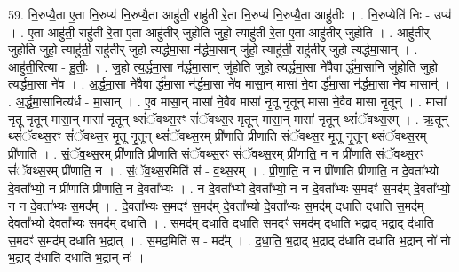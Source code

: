 \documentclass[17pt]{extarticle}
\begin{document}
59. नि॒रुप्यै॒ता ए॒ता नि॒रुप्य॑ नि॒रुप्यै॒ता आहु॑ती॒ राहु॑ती रे॒ता नि॒रुप्य॑ नि॒रुप्यै॒ता आहु॑तीः । . नि॒रुप्येति॑ निः - उप्य॑ । . ए॒ता आहु॑ती॒ राहु॑ती रे॒ता ए॒ता आहु॑तीर् जुहोति जुहो॒ त्याहु॑ती रे॒ता ए॒ता आहु॑तीर् जुहोति । . आहु॑तीर् जुहोति जुहो॒ त्याहु॑ती॒ राहु॑तीर् जुहो त्यर्द्धमा॒सा न॑र्द्धमा॒सान् जु॑हो॒ त्याहु॑ती॒ राहु॑तीर् जुहो त्यर्द्धमा॒सान् । . आहु॑ती॒रित्या - हु॒तीः॒ । . जु॒हो॒ त्य॒र्द्ध॒मा॒सा न॑र्द्धमा॒सान् जु॑होति जुहो त्यर्द्धमा॒सा ने॑वैवा र्द्ध॑मा॒सानि जु॑होति जुहो
त्यर्द्धमा॒सा ने॑व । . अ॒र्द्ध॒मा॒सा ने॑वैवा र्द्ध॑मा॒सा न॑र्द्धमा॒सा ने॑व मासा॒न् मासा॑ ने॒वा र्द्ध॑मा॒सा
न॑र्द्धमा॒सा ने॑व मासान्॑ । . अ॒र्द्ध॒मा॒सानित्य॑र्ध - मा॒सान् । . ए॒व मासा॒न् मासा॑ ने॒वैव मासा॑ नृ॒तू नृ॒तून् मासा॑ ने॒वैव मासा॑ नृ॒तून् । . मासा॑ नृ॒तू नृ॒तून् मासा॒न् मासा॑ नृ॒तून् थ्सं॑ॅवथ्स॒रꣳ सं॑ॅवथ्स॒र मृ॒तून् मासा॒न् मासा॑ नृ॒तून् थ्सं॑ॅवथ्स॒रम् । . ऋ॒तून् थ्सं॑ॅवथ्स॒रꣳ सं॑ॅवथ्स॒र मृ॒तू नृ॒तून् थ्सं॑ॅवथ्स॒रम् प्री॑णाति प्रीणाति संॅवथ्स॒र मृ॒तू नृ॒तून् थ्सं॑ॅवथ्स॒रम् प्री॑णाति । . सं॒ॅव॒थ्स॒रम् प्री॑णाति प्रीणाति संॅवथ्स॒रꣳ सं॑ॅवथ्स॒रम् प्री॑णाति॒ न न प्री॑णाति संॅवथ्स॒रꣳ सं॑ॅवथ्स॒रम् प्री॑णाति॒ न । . सं॒ॅव॒थ्स॒रमिति॑ सं - व॒थ्स॒रम् । . प्री॒णा॒ति॒ न न प्री॑णाति प्रीणाति॒ न दे॒वता᳚भ्यो दे॒वता᳚भ्यो॒ न प्री॑णाति प्रीणाति॒ न दे॒वता᳚भ्यः । . न दे॒वता᳚भ्यो दे॒वता᳚भ्यो॒ न न दे॒वता᳚भ्यः स॒मदꣳ॑ स॒मद॑म् दे॒वता᳚भ्यो॒ न न दे॒वता᳚भ्यः स॒मद᳚म् । . दे॒वता᳚भ्यः स॒मदꣳ॑ स॒मद॑म् दे॒वता᳚भ्यो दे॒वता᳚भ्यः स॒मद॑म् दधाति दधाति स॒मद॑म् दे॒वता᳚भ्यो दे॒वता᳚भ्यः स॒मद॑म् दधाति । . स॒मद॑म् दधाति दधाति स॒मदꣳ॑ स॒मद॑म् दधाति भ॒द्राद् भ॒द्राद् द॑धाति स॒मदꣳ॑ स॒मद॑म् दधाति भ॒द्रात् । . स॒मद॒मिति॑ स - मद᳚म् । . द॒धा॒ति॒ भ॒द्राद् भ॒द्राद् द॑धाति दधाति भ॒द्रान् नो॑ नो भ॒द्राद् द॑धाति दधाति भ॒द्रान् नः॑ । \newline
\end{document}
